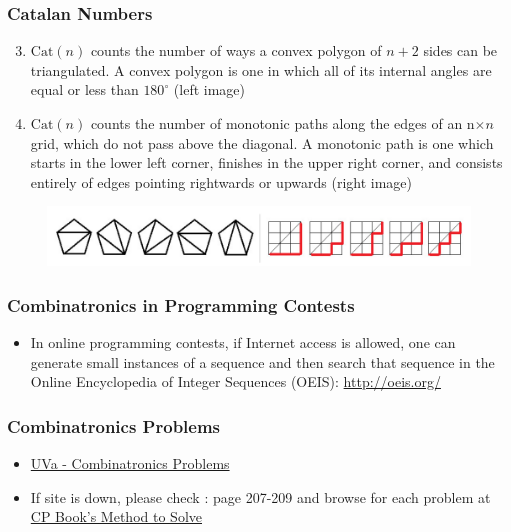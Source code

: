 \documentclass{beamer}
\begin{document}
\begin{frame}[fragile]
\frametitle{Catalan Numbers}

\begin{enumerate}
	\setcounter{enumi}{2}
    \item $\text{Cat}(n)$ counts the number of ways a convex polygon of $n + 2$ sides can be triangulated. A convex polygon is one in which all of its internal angles are equal or less than $180^\circ$ \color{blue}(left image)\color{black}
    \item $\text{Cat}(n)$ counts the number of monotonic paths along the edges of an n$ \times n$ grid, which do not pass above the diagonal. A monotonic path is one which starts in the lower left corner, finishes in the upper right corner, and consists entirely of edges pointing rightwards or upwards \color{blue}(right image)\color{black}
\end{enumerate}

\begin{figure}
    \centering
    \includegraphics[scale=0.5]{imgs/catalan_2.png}
\end{figure}

\end{frame}

\begin{frame}[fragile]
\frametitle{Combinatronics in Programming Contests}

\begin{itemize}
    \item In online programming contests, if Internet access is allowed, one can generate small instances of a sequence and then search that sequence in the Online Encyclopedia of Integer Sequences (OEIS): \url{http://oeis.org/}
\end{itemize}

\end{frame}


\begin{frame}[fragile]
\frametitle{Combinatronics Problems}

\begin{itemize}
    \item \href{https://onlinejudge.org/index.php?option=com_onlinejudge&Itemid=8&category=713}{UVa - Combinatronics Problems}
    \item If site is down, please check \cite{Halim}: page 207-209 and browse for each problem at \href{https://cpbook.net/methodstosolve}{CP Book's Method to Solve}
\end{itemize}

\end{frame}
\end{document}
